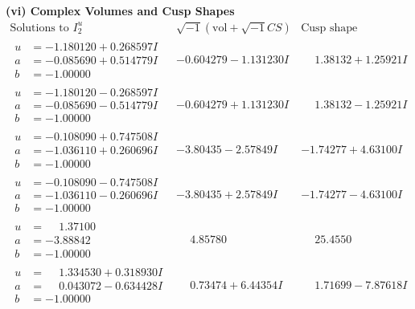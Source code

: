 \documentclass[1p]{elsarticle_modified}
\theoremstyle{definition}
\newcommand{\I}{\sqrt{-1}}
\begin{document}
\newpage\flushleft \textbf{(vi) Complex Volumes and Cusp Shapes}
$$\begin{array}{c|c|c}  
\text{Solutions to }I^u_{2}& \I (\text{vol} + \sqrt{-1}CS) & \text{Cusp shape}\\
 \hline 
\begin{aligned}
u &= -1.180120 + 0.268597 I \\
a &= -0.085690 + 0.514779 I \\
b &= -1.00000\phantom{ +0.000000I}\end{aligned}
 & -0.604279 - 1.131230 I & \phantom{-}1.38132 + 1.25921 I \\ \hline\begin{aligned}
u &= -1.180120 - 0.268597 I \\
a &= -0.085690 - 0.514779 I \\
b &= -1.00000\phantom{ +0.000000I}\end{aligned}
 & -0.604279 + 1.131230 I & \phantom{-}1.38132 - 1.25921 I \\ \hline\begin{aligned}
u &= -0.108090 + 0.747508 I \\
a &= -1.036110 + 0.260696 I \\
b &= -1.00000\phantom{ +0.000000I}\end{aligned}
 & -3.80435 - 2.57849 I & -1.74277 + 4.63100 I \\ \hline\begin{aligned}
u &= -0.108090 - 0.747508 I \\
a &= -1.036110 - 0.260696 I \\
b &= -1.00000\phantom{ +0.000000I}\end{aligned}
 & -3.80435 + 2.57849 I & -1.74277 - 4.63100 I \\ \hline\begin{aligned}
u &= \phantom{-}1.37100\phantom{ +0.000000I} \\
a &= -3.88842\phantom{ +0.000000I} \\
b &= -1.00000\phantom{ +0.000000I}\end{aligned}
 & \phantom{-}4.85780\phantom{ +0.000000I} & \phantom{-}25.4550\phantom{ +0.000000I} \\ \hline\begin{aligned}
u &= \phantom{-}1.334530 + 0.318930 I \\
a &= \phantom{-}0.043072 - 0.634428 I \\
b &= -1.00000\phantom{ +0.000000I}\end{aligned}
 & \phantom{-}0.73474 + 6.44354 I & \phantom{-}1.71699 - 7.87618 I \\ \hline\begin{aligned}

\end{aligned}
\end{array}$$
\end{document}
